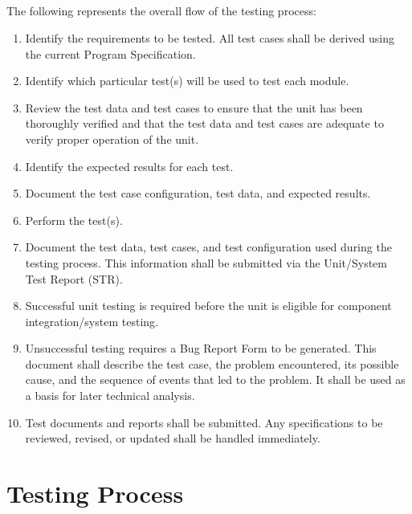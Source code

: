 \documentclass[a4paper,10pt]{scrreprt}
\begin{document}
\paragraph{}
The following represents the overall flow of the testing process:
\begin{enumerate}
    \item Identify the requirements to be tested. All test cases shall be derived using the current Program Specification.
    \item Identify which particular test(s) will be used to test each module.
    \item Review the test data and test cases to ensure that the unit has been thoroughly verified and that the test data and test cases are adequate to verify proper operation of the unit.
    \item Identify the expected results for each test.
    \item Document the test case configuration, test data, and expected results.
    \item Perform the test(s).
    \item Document the test data, test cases, and test configuration used during the testing process. This information shall be submitted via the Unit/System Test Report (STR).
    \item Successful unit testing is required before the unit is eligible for component integration/system testing.
    \item Unsuccessful testing requires a Bug Report Form to be generated. This document shall describe the test case, the problem encountered, its possible cause, and the sequence of events that led to the problem. It shall be used as a basis for later technical analysis.
    \item Test documents and reports shall be submitted. Any specifications to be reviewed, revised, or updated shall be handled immediately.
\end{enumerate}

\chapter{Testing Process}
\end{document}
